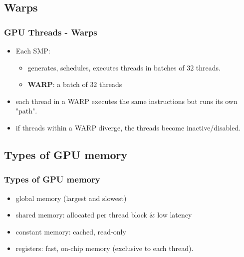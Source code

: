 \subsection{Warps}
\begin{frame}
\frametitle{GPU Threads - Warps}	
\begin{itemize}
  \item Each SMP:	
  \begin{itemize}
     \item generates, schedules, executes threads in batches of $32$ threads.
     \item \textbf{WARP}: a batch of $32$ threads
  \end{itemize}
  \item each thread in a WARP executes the same instructions but runs its own "path".
  \item if threads within a WARP diverge, the threads become inactive/disabled.
\end{itemize}	   
\end{frame} 

\subsection{Types of GPU memory}
\begin{frame}
\frametitle{Types of GPU memory}
\begin{itemize}
  \item global memory (largest and slowest)
  \item shared memory: allocated per thread block \& low latency
  \item constant memory: cached, read-only
  \item registers: fast, on-chip memory (exclusive to each thread).
\end{itemize}	  
\end{frame}


